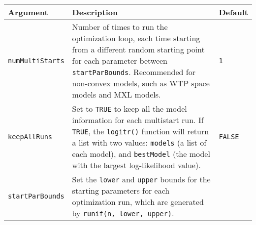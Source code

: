 \documentclass[article]{jss}
\begin{document}
\begin{longtable}[]{@{}lll@{}}
\toprule
\begin{minipage}[b]{0.18\columnwidth}\raggedright
Argument\strut
\end{minipage} & \begin{minipage}[b]{0.61\columnwidth}\raggedright
Description\strut
\end{minipage} & \begin{minipage}[b]{0.12\columnwidth}\raggedright
Default\strut
\end{minipage}\tabularnewline
\midrule
\endhead
\begin{minipage}[t]{0.18\columnwidth}\raggedright
\texttt{numMultiStarts}\strut
\end{minipage} & \begin{minipage}[t]{0.61\columnwidth}\raggedright
Number of times to run the optimization loop, each time starting from a
different random starting point for each parameter between
\texttt{startParBounds}. Recommended for non-convex models, such as WTP
space models and MXL models.\strut
\end{minipage} & \begin{minipage}[t]{0.12\columnwidth}\raggedright
\texttt{1}\strut
\end{minipage}\tabularnewline
\begin{minipage}[t]{0.18\columnwidth}\raggedright
\texttt{keepAllRuns}\strut
\end{minipage} & \begin{minipage}[t]{0.61\columnwidth}\raggedright
Set to \texttt{TRUE} to keep all the model information for each
multistart run. If \texttt{TRUE}, the \texttt{logitr()} function will
return a list with two values: \texttt{models} (a list of each model),
and \texttt{bestModel} (the model with the largest log-likelihood
value).\strut
\end{minipage} & \begin{minipage}[t]{0.12\columnwidth}\raggedright
\texttt{FALSE}\strut
\end{minipage}\tabularnewline
\begin{minipage}[t]{0.18\columnwidth}\raggedright
\texttt{startParBounds}\strut
\end{minipage} & \begin{minipage}[t]{0.61\columnwidth}\raggedright
Set the \texttt{lower} and \texttt{upper} bounds for the starting
parameters for each optimization run, which are generated by
\texttt{runif(n,\ lower,\ upper)}.\strut
\end{minipage} & \begin{minipage}[t]{0.12\columnwidth}\raggedright

\end{minipage}
\end{longtable}
\end{document}
